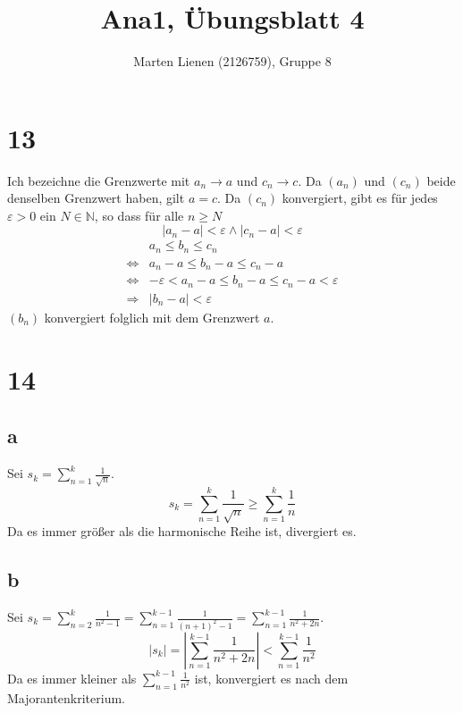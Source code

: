 \documentclass[a4paper,10pt]{article}
\title{Ana1, Übungsblatt 4}
\author{Marten Lienen (2126759), Gruppe 8}
\begin{document}
\maketitle

\section*{13}

Ich bezeichne die Grenzwerte mit $a_n \rightarrow a$ und $c_n \rightarrow c$.
Da $(a_n)$ und $(c_n)$ beide denselben Grenzwert haben, gilt $a = c$.
Da $(c_n)$ konvergiert, gibt es für jedes $\varepsilon > 0$ ein $N \in \mathbb{N}$, so dass für alle $n \ge N$
\begin{equation}
 |a_n - a| < \varepsilon \land |c_n - a| < \varepsilon
\end{equation}
\begin{align*}
 & a_n \le b_n \le c_n\\
 \Leftrightarrow & a_n - a \le b_n - a \le c_n - a\\
 \Leftrightarrow & -\varepsilon < a_n - a  \le b_n - a \le c_n - a < \varepsilon\\
 \Rightarrow & |b_n - a| < \varepsilon
\end{align*}
$(b_n)$ konvergiert folglich mit dem Grenzwert $a$.

\section*{14}

\subsection*{a}

Sei $s_k = \sum_{n = 1}^k \frac{1}{\sqrt{n}}$.
\begin{equation}
 s_k = \sum_{n = 1}^k \frac{1}{\sqrt{n}} \ge \sum_{n = 1}^k \frac{1}{n}
\end{equation}
Da es immer größer als die harmonische Reihe ist, divergiert es.

\subsection*{b}

Sei $s_k = \sum_{n = 2}^k \frac{1}{n^2 - 1} = \sum_{n = 1}^{k - 1} \frac{1}{(n + 1)^2 - 1} = \sum_{n = 1}^{k - 1} \frac{1}{n^2 + 2n}$.
\begin{equation}
 |s_k| = |\sum_{n = 1}^{k - 1} \frac{1}{n^2 + 2n}| < \sum_{n = 1}^{k - 1} \frac{1}{n^2}
\end{equation}
Da es immer kleiner als $\sum_{n = 1}^{k - 1} \frac{1}{n^2}$ ist, konvergiert es nach dem Majorantenkriterium.
\end{document}
